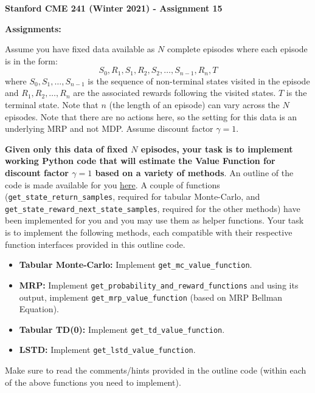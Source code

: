 \documentclass[12pt]{exam}
\begin{document}
\begin{center}
{\large {\bf Stanford CME 241 (Winter 2021) - Assignment 15}}
\end{center}
 
{\large{\bf Assignments:}}
\begin{questions}

\question Assume you have fixed data available as $N$ complete episodes where each episode is in the form:
$$S_0,R_1,S_1,R_2, S_2,\ldots, S_{n-1},R_n, T$$
where $S_0,S_1,\ldots,S_{n-1}$ is the sequence of non-terminal states visited in the episode and $R_1,R_2,\ldots,R_n$ are the associated rewards following the visited states. $T$ is the terminal state. Note that $n$ (the length of an episode) can vary across the $N$ episodes. Note that there are no actions here, so the setting for this data is an underlying MRP and not MDP. Assume discount factor $\gamma = 1$.

{\bf Given only this data of fixed $N$ episodes, your task is to implement working Python code that will estimate the Value Function for discount factor $\gamma = 1$ based on a variety of methods}. An outline of the code is made available for you \href{https://github.com/coverdrive/MDP-DP-RL/blob/master/src/examples/exam_problems/mrp_tdmc_outline.py}{here}. A couple of functions (\lstinline{get_state_return_samples}, required for tabular Monte-Carlo, and \lstinline{get_state_reward_next_state_samples}, required for the other methods) have been implemented for you and you may use them as helper functions. Your task is to implement the following methods, each compatible with their respective function interfaces provided in this outline code. 

\begin{itemize}
\item {\bf Tabular Monte-Carlo: } Implement \lstinline{get_mc_value_function}.
\item {\bf MRP: } Implement \lstinline{get_probability_and_reward_functions} and using its output, implement \lstinline{get_mrp_value_function} (based on MRP Bellman Equation).
\item {\bf Tabular TD(0): } Implement \lstinline{get_td_value_function}.
\item {\bf LSTD: } Implement \lstinline{get_lstd_value_function}.
\end{itemize}

Make sure to read the comments/hints provided in the outline code (within each of the above functions you need to implement).


\end{questions}
\end{document}
